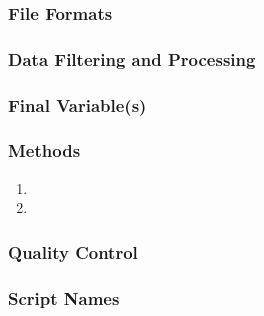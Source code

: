 



\subsubsection*{File Formats} 

\subsubsection*{Data Filtering and Processing}

\subsubsection*{Final Variable(s)}

\subsubsection*{Methods}

\begin{enumerate}
\item 
\item
\end{enumerate}

\subsubsection*{Quality Control}

\subsubsection*{Script Names}

